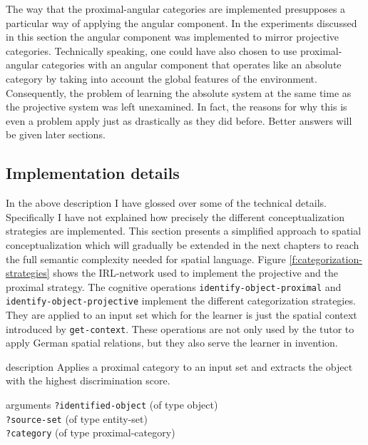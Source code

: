 The way that the proximal-angular categories are implemented presupposes a particular
way of applying the angular component. In the experiments discussed in this section
the angular component was implemented to mirror projective categories. 
Technically speaking, one could have also chosen to use proximal-angular
categories with an angular component that operates like an absolute category by
taking into account the global features of the environment. Consequently, 
the problem of learning the absolute system at the same time as the projective system 
was left unexamined. In fact, the reasons for why this is even a problem apply 
just as drastically as they did before. Better answers will be given later sections.

\subsection{Implementation details}
In the above description I have glossed over some of the technical details. 
Specifically I have not explained how precisely the different conceptualization 
strategies are implemented. This section presents a simplified approach to spatial
conceptualization which will gradually be extended in the next chapters
to reach the full semantic complexity needed for spatial language.
Figure \ref{f:categorization-strategies} shows the IRL-network
used to implement the projective and the proximal strategy. The cognitive
operations {\footnotesize\tt identify-object-proximal} and  {\footnotesize\tt identify-object-projective}
implement the different categorization strategies. They are applied to an 
input set which for the learner is just the spatial context introduced by 
{\footnotesize\tt get-context}. These operations are not only used by the tutor to apply German 
spatial relations, but they also serve the learner in invention. 

\begin{explanation}{description}
Applies a proximal category to an input set and extracts the 
object with the highest discrimination score.
\end{explanation}
\begin{explanation}{arguments}
{\footnotesize\verb+?identified-object+} (of type object) \\
{\footnotesize\verb+?source-set+} (of type entity-set) \\
{\footnotesize\verb+?category+} (of type proximal-category)
\vspace{0.3cm}
\end{explanation}

